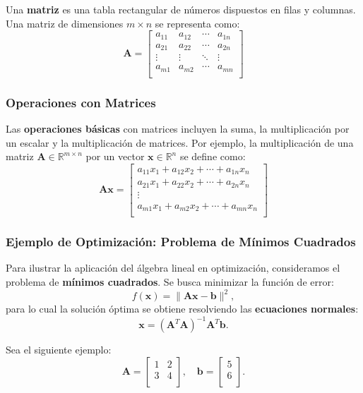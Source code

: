 \documentclass[12pt,a4,oneside]{book}
\begin{document}
	Una \textbf{matriz} es una tabla rectangular de números dispuestos en filas y columnas. Una matriz de dimensiones \(m \times n\) se representa como:
	\[
	\mathbf{A} = \begin{bmatrix}
		a_{11} & a_{12} & \cdots & a_{1n} \\
		a_{21} & a_{22} & \cdots & a_{2n} \\
		\vdots & \vdots & \ddots & \vdots \\
		a_{m1} & a_{m2} & \cdots & a_{mn} \\
	\end{bmatrix}
	\]
	
	\subsubsection{Operaciones con Matrices}
	
	Las \textbf{operaciones básicas} con matrices incluyen la suma, la multiplicación por un escalar y la multiplicación de matrices. Por ejemplo, la multiplicación de una matriz \(\mathbf{A} \in \mathbb{R}^{m \times n}\) por un vector \(\mathbf{x} \in \mathbb{R}^n\) se define como:
	\[
	\mathbf{A}\mathbf{x} = \begin{bmatrix}
		a_{11}x_1 + a_{12}x_2 + \cdots + a_{1n}x_n \\
		a_{21}x_1 + a_{22}x_2 + \cdots + a_{2n}x_n \\
		\vdots \\
		a_{m1}x_1 + a_{m2}x_2 + \cdots + a_{mn}x_n \\
	\end{bmatrix}
	\]
	
	\subsubsection{Ejemplo de Optimización: Problema de Mínimos Cuadrados}
	
	Para ilustrar la aplicación del álgebra lineal en optimización, consideramos el problema de \textbf{mínimos cuadrados}. Se busca minimizar la función de error:
	\[
	f(\mathbf{x}) = \|\mathbf{A}\mathbf{x} - \mathbf{b}\|^2,
	\]
	para lo cual la solución óptima se obtiene resolviendo las \textbf{ecuaciones normales}:
	\[
	\mathbf{x} = (\mathbf{A}^T \mathbf{A})^{-1}\mathbf{A}^T\mathbf{b}.
	\]
	
	Sea el siguiente ejemplo:
	\[
	\mathbf{A} = \begin{bmatrix}
		1 & 2 \\
		3 & 4 \\
	\end{bmatrix}, \quad \mathbf{b} = \begin{bmatrix}
		5 \\
		6 \\
	\end{bmatrix}.
	\]
	
\end{document}
